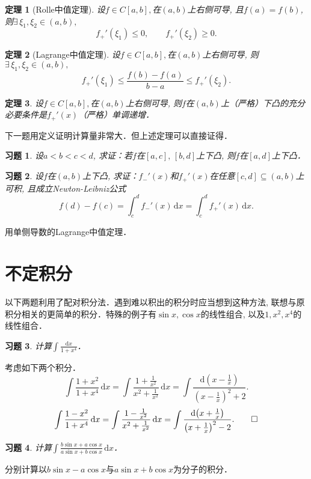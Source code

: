 \documentclass[11pt,a4paper]{ctexart}
\makeatletter
\theoremstyle{thmseries} %
\newtheorem{thm}{定理}[section]
\theoremstyle{exerseries}
\newtheorem{exer}{习题}[section]
\renewenvironment{proof}[1][\proofname]{\par
  \pushQED{\qed}%
  \normalfont \topsep6\p@\@plus6\p@\relax
  \trivlist
  \item[\hskip\labelsep
        \itshape
    #1\@addpunct{}]\ignorespaces
}{%
  \popQED\endtrivlist\@endpefalse
}
\newenvironment{sol}{\begin{proof}[\bfseries\upshape 解\quad]}{\end{proof}}
\newenvironment{pf}{\begin{proof}[\bfseries\upshape 证\quad]}{\end{proof}}
\newcommand{\bra}[1]{\mathopen{}\left(#1\right)}
\renewcommand{\d}{\mathrm{d}}
\makeatother
\begin{document}
\begin{thm}[Rolle中值定理]
	设$f\in C[a,b],$在$(a,b)$上右侧可导, 且$f(a)=f(b)$, 则$\exists\,\xi_1,\xi_2\in(a,b),$
	\[f_+'(\xi_1)\leq0,\qquad f_+'(\xi_2)\geq0.\]
\end{thm}

\begin{thm}[Lagrange中值定理]
	设$f\in C[a,b],$在$(a,b)$上右侧可导, 则$\exists\,\xi_1,\xi_2\in(a,b),$
	\[f_+'(\xi_1)\leq\frac{f(b)-f(a)}{b-a}\leq f_+'(\xi_2).\]
\end{thm}

\begin{thm}
	设$f\in C[a,b],$在$(a,b)$上右侧可导, 则$f$在$(a,b)$上（严格）下凸的充分必要条件是$f_+'(x)$（严格）单调递增．
\end{thm}

下一题用定义证明计算量非常大．但上述定理可以直接证得．
\begin{exer}
	设$a<b<c<d$, 求证：若$f$在$[a,c],\,[b,d]$上下凸, 则$f$在$[a,d]$上下凸．
\end{exer}

\begin{exer}
	设$f$在$(a,b)$上下凸, 求证：$f_-'(x)$和$f_+'(x)$在任意$[c,d]\subseteq(a,b)$上可积, 且成立Newton-Leibniz公式
	\[f(d)-f(c)=\int_{c}^{d}f_-'(x)\,\d x=\int_{c}^{d}f_+'(x)\,\d x.\]
\end{exer}
\begin{pf}
	用单侧导数的Lagrange中值定理．
\end{pf}


\section{不定积分}
以下两题利用了配对积分法．遇到难以积出的积分时应当想到这种方法, 联想与原积分相关的更简单的积分．特殊的例子有$\sin x,\cos x$的线性组合, 以及$1,x^2,x^4$的线性组合．
\begin{exer}
	计算$\int\frac{\d x}{1+x^4}$．
\end{exer}
\begin{sol}
	考虑如下两个积分．
	\[\int\frac{1+x^2}{1+x^4}\,\d x=\int\frac{1+\frac{1}{x^2}}{x^2+\frac{1}{x^2}}\,\d x=\int\frac{\d\bra{x-\frac{1}{x}}}{\bra{x-\frac{1}{x}}^2+2}.\]
	\[\int\frac{1-x^2}{1+x^4}\,\d x=\int\frac{1-\frac{1}{x^2}}{x^2+\frac{1}{x^2}}\,\d x=\int\frac{\d\bra{x+\frac{1}{x}}}{\bra{x+\frac{1}{x}}^2-2}.\qedhere\]
\end{sol}

\begin{exer}
	计算$\int\frac{b\sin x+a\cos x}{a\sin x+b\cos x}\,\d x$．
\end{exer}
\begin{sol}
	分别计算以$b\sin x-a\cos x$与$a\sin x+b\cos x$为分子的积分．
\end{sol}
\end{document}
